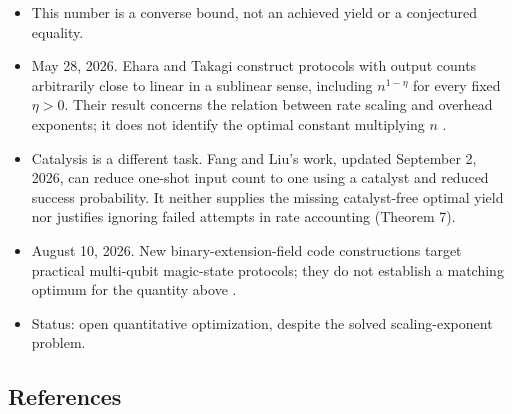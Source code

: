 \begin{itemize}
  \item This number is a converse bound, not an achieved yield or a conjectured equality.

  \item May 28, 2026. Ehara and Takagi construct protocols with output counts arbitrarily close to linear in a sublinear sense, including $n^{1-\eta}$ for every fixed $\eta>0$. Their result concerns the relation between rate scaling and overhead exponents; it does not identify the optimal constant multiplying $n$ .

  \item Catalysis is a different task. Fang and Liu’s work, updated September 2, 2026, can reduce one-shot input count to one using a catalyst and reduced success probability. It neither supplies the missing catalyst-free optimal yield nor justifies ignoring failed attempts in rate accounting  (Theorem 7).

  \item August 10, 2026. New binary-extension-field code constructions target practical multi-qubit magic-state protocols; they do not establish a matching optimum for the quantity above .

  \item Status: open quantitative optimization, despite the solved scaling-exponent problem.
\end{itemize}

\subsection*{References}

